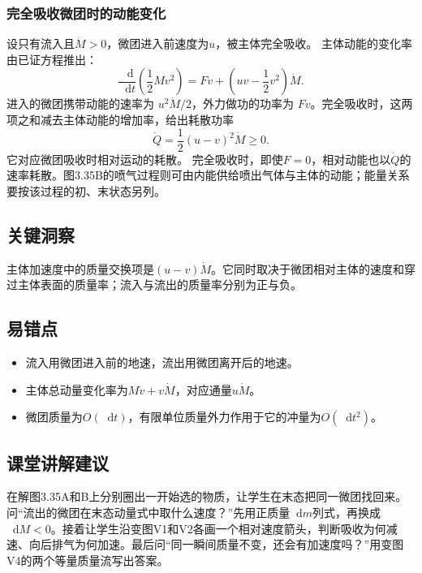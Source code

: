 \documentclass[UTF8,fontset=fandol,a4paper,11pt]{ctexart}
\newcommand{\dd}{\mathop{}\!\mathrm{d}}
\begin{document}
\subsubsection*{完全吸收微团时的动能变化}
设只有流入且$\dot M>0$，微团进入前速度为$u$，被主体完全吸收。
主体动能的变化率由已证方程推出：
\[
\frac{\dd}{\dd t}\left(\frac12Mv^2\right)
=Fv+\left(uv-\frac12v^2\right)\dot M.
\]
进入的微团携带动能的速率为 $u^2\dot M/2$，外力做功的功率为 $Fv$。完全吸收时，这两项之和减去主体动能的增加率，给出耗散功率
\[
\dot Q=\frac12(u-v)^2\dot M\geq0.
\]
它对应微团吸收时相对运动的耗散。
完全吸收时，即使$F=0$，相对动能也以$\dot Q$的速率耗散。图3.35B的喷气过程则可由内能供给喷出气体与主体的动能；能量关系要按该过程的初、末状态另列。




\subsection*{关键洞察}

主体加速度中的质量交换项是$(u-v)\dot M$。它同时取决于微团相对主体的速度和穿过主体表面的质量率；流入与流出的质量率分别为正与负。



\subsection*{易错点}

\begin{itemize}
\item 流入用微团进入前的地速，流出用微团离开后的地速。
\item 主体总动量变化率为$M\dot v+v\dot M$，对应通量$u\dot M$。
\item 微团质量为$O(\dd t)$，有限单位质量外力作用于它的冲量为$O(\dd t^2)$。
\end{itemize}



\subsection*{课堂讲解建议}

在解图3.35A和B上分别圈出一开始选的物质，让学生在末态把同一微团找回来。问“流出的微团在末态动量式中取什么速度？”先用正质量$\dd m$列式，再换成$\dd M<0$。接着让学生沿变图V1和V2各画一个相对速度箭头，判断吸收为何减速、向后排气为何加速。最后问“同一瞬间质量不变，还会有加速度吗？”用变图V4的两个等量质量流写出答案。
\end{document}
